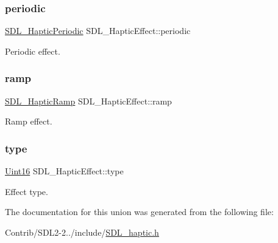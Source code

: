 \subsubsection{\texorpdfstring{periodic}{periodic}}
{\footnotesize\ttfamily \mbox{\hyperlink{struct_s_d_l___haptic_periodic}{S\+D\+L\+\_\+\+Haptic\+Periodic}} S\+D\+L\+\_\+\+Haptic\+Effect\+::periodic}

Periodic effect. \mbox{\label{union_s_d_l___haptic_effect_a1d32ef4c2d1cc89dc938b392f6ad81bd}} 
\subsubsection{\texorpdfstring{ramp}{ramp}}
{\footnotesize\ttfamily \mbox{\hyperlink{struct_s_d_l___haptic_ramp}{S\+D\+L\+\_\+\+Haptic\+Ramp}} S\+D\+L\+\_\+\+Haptic\+Effect\+::ramp}

Ramp effect. \mbox{\label{union_s_d_l___haptic_effect_a5ff6cfd8da91537091e9a6c2108cb179}} 
\subsubsection{\texorpdfstring{type}{type}}
{\footnotesize\ttfamily \mbox{\hyperlink{_s_d_l__stdinc_8h_a31fcc0a076c9068668173ee26d33e42b}{Uint16}} S\+D\+L\+\_\+\+Haptic\+Effect\+::type}

Effect type. 

The documentation for this union was generated from the following file\+:\begin{DoxyCompactItemize}
\item 
Contrib/\+S\+D\+L2-\/2../include/\mbox{\hyperlink{_s_d_l__haptic_8h}{S\+D\+L\+\_\+haptic.\+h}}\end{DoxyCompactItemize}
